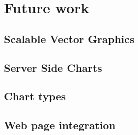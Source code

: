 \chapter{Future work}

\section{Scalable Vector Graphics}

\section{Server Side Charts}

\section{Chart types}

\section{Web page integration}
